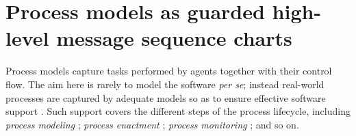 \section{Process models as guarded high-level message sequence charts\label{section:background-process-models}}

Process models capture tasks performed by agents together with their control flow. The aim here is rarely to model the software \emph{per se}; instead real-world processes are captured by adequate models so as to ensure effective software support \cite{Dumas:2005}. Such support covers the different steps of the process lifecycle, including \emph{process modeling} \cite{OMG:2004, OMG:2008, Clarke:2008, Damas:2009}; \emph{process enactment} \cite{Manolescu:2002, Buhler:2005, Sauer:2006}; \emph{process monitoring} \cite{Muehlen:2000}; and so on.

